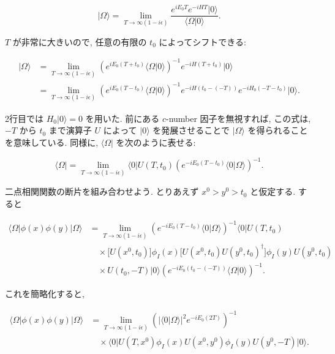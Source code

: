 \documentclass[a4paper,12pt]{article}
\begin{document}
\begin{equation*}
\lvert \Omega \rangle = \lim_{T \to \infty (1-i\epsilon)}
\frac{e^{iE_0 T} e^{-iHT}\lvert 0 \rangle}{\langle \Omega | 0 \rangle}. \tag{4.27}
\end{equation*}

$T$ が非常に大きいので, 任意の有限の $t_0$ によってシフトできる:

\begin{align*}
\lvert \Omega \rangle &= \lim_{T \to \infty (1-i\epsilon)} 
(e^{iE_0(T+t_0)} \langle \Omega | 0 \rangle)^{-1} e^{-iH(T+t_0)} \lvert 0 \rangle \\
&= \lim_{T \to \infty (1-i\epsilon)} 
(e^{iE_0(T-t_0)} \langle \Omega | 0 \rangle)^{-1} 
e^{-iH(t_0-(-T))} e^{-iH_0(-T-t_0)} \lvert 0 \rangle. \tag{4.28}
\end{align*}

2行目では $H_0 \lvert 0 \rangle = 0$ を用いた. 前にある $c$-number 因子を無視すれば, 
この式は, $-T$ から $t_0$ まで演算子 $U$ によって $\lvert 0 \rangle$ を発展させることで 
$\lvert \Omega \rangle$ を得られることを意味している. 
同様に, $\langle \Omega \lvert$ を次のように表せる:

\begin{equation*}
\langle \Omega \lvert 
= \lim_{T \to \infty (1-i\epsilon)} 
\langle 0 \lvert U(T,t_0) \left(e^{-iE_0 (T-t_0)} \langle 0 | \Omega \rangle \right)^{-1}.
\tag{4.29}
\end{equation*}

二点相関関数の断片を組み合わせよう. 
とりあえず $x^0 > y^0 > t_0$ と仮定する. すると

\begin{align*}
\langle \Omega \lvert \phi(x)\phi(y) \lvert \Omega \rangle 
&= \lim_{T \to \infty (1-i\epsilon)} 
\left( e^{-iE_0 (T-t_0)} \langle 0 | \Omega \rangle \right)^{-1} 
\langle 0 \lvert U(T,t_0) \\
&\quad \times \big[ U(x^0,t_0)\big] \phi_I(x) \big[U(x^0,t_0)U(y^0,t_0)^\dagger \big] \phi_I(y) U(y^0,t_0) \\
&\quad \times U(t_0,-T)\lvert 0 \rangle 
\left( e^{-iE_0 (t_0-(-T))} \langle \Omega | 0 \rangle \right)^{-1}.
\end{align*}

これを簡略化すると,

\begin{align*}
\langle \Omega \lvert \phi(x)\phi(y) \lvert \Omega \rangle 
&= \lim_{T \to \infty (1-i\epsilon)} 
\left( \lvert \langle 0 | \Omega \rangle \rvert^2 e^{-iE_0 (2T)} \right)^{-1} \\
&\quad \times \langle 0 \lvert U(T,x^0)\phi_I(x)U(x^0,y^0)\phi_I(y)U(y^0,-T)\lvert 0 \rangle .
\tag{4.30}
\end{align*}
\end{document}

